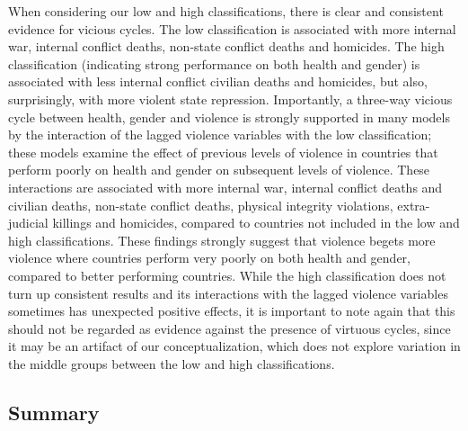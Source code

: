 \documentclass[12pt]{article}
\begin{document}
When considering our low and high classifications, there is clear and consistent evidence for vicious cycles.
The low classification is associated with more internal war, internal conflict deaths, non-state conflict deaths and homicides.
The high classification (indicating strong performance on both health and gender) is associated with less internal conflict civilian deaths and homicides, but also, surprisingly, with more violent state repression.
Importantly, a three-way vicious cycle between health, gender and violence is strongly supported in many models by the interaction of the lagged violence variables with the low classification; these models examine the effect of previous levels of violence in countries that perform poorly on health and gender on subsequent levels of violence.
These interactions are associated with more internal war, internal conflict deaths and civilian deaths, non-state conflict deaths, physical integrity violations, extra-judicial killings and homicides, compared to countries not included in the low and high classifications.
These findings strongly suggest that violence begets more violence where countries perform very poorly on both health and gender, compared to better performing countries.
While the high classification does not turn up consistent results and its interactions with the lagged violence variables sometimes has unexpected positive effects, it is important to note again that this should not be regarded as evidence against the presence of virtuous cycles, since it may be an artifact of our conceptualization, which does not explore variation in the middle groups between the low and high classifications.

\subsection{Summary}
\end{document}
